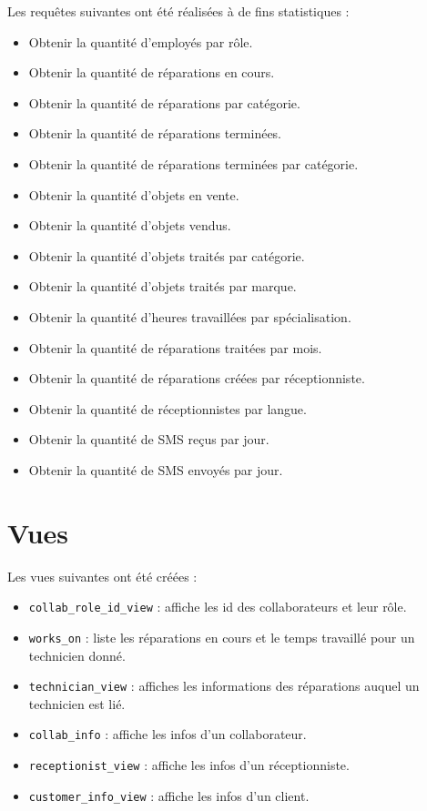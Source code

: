 \documentclass{article}
\newcommand{\ttt}{\texttt}
\begin{document}
    Les requêtes suivantes ont été réalisées à de fins statistiques :
    \begin{itemize}
        \item Obtenir la quantité d'employés par rôle.
        \item Obtenir la quantité de réparations en cours.
        \item Obtenir la quantité de réparations par catégorie.
        \item Obtenir la quantité de réparations terminées.
        \item Obtenir la quantité de réparations terminées par catégorie.
        \item Obtenir la quantité d'objets en vente.
        \item Obtenir la quantité d'objets vendus.
        \item Obtenir la quantité d'objets traités par catégorie.
        \item Obtenir la quantité d'objets traités par marque.
        \item Obtenir la quantité d'heures travaillées par spécialisation.
        \item Obtenir la quantité de réparations traitées par mois.
        \item Obtenir la quantité de réparations créées par réceptionniste.
        \item Obtenir la quantité de réceptionnistes par langue.
        \item Obtenir la quantité de SMS reçus par jour.
        \item Obtenir la quantité de SMS envoyés par jour.
    \end{itemize}

    \pagebreak

    \section{Vues}

    Les vues suivantes ont été créées :
    \begin{itemize}
        \item \ttt{collab\_role\_id\_view} : affiche les id des collaborateurs et leur rôle.
        \item \ttt{works\_on} : liste les réparations en cours et le temps travaillé pour un technicien donné.
        \item \ttt{technician\_view} : affiches les informations des réparations auquel un technicien est lié.
        \item \ttt{collab\_info} : affiche les infos d'un collaborateur.
        \item \ttt{receptionist\_view} : affiche les infos d'un réceptionniste.
        \item \ttt{customer\_info\_view} : affiche les infos d'un client.
    \end{itemize}
\end{document}
